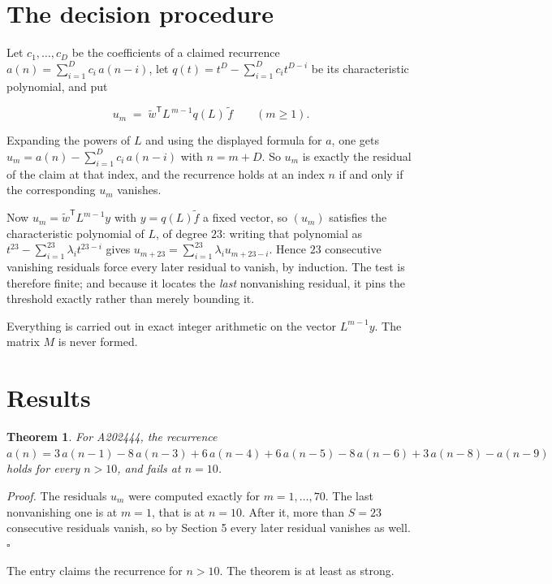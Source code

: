 \documentclass[11pt]{article}
\newtheorem{theorem}{Theorem}
\theoremstyle{definition}
\begin{document}
\section{The decision procedure}

Let $c_1,\dots,c_D$ be the coefficients of a claimed recurrence $a(n) = \sum_{i=1}^{D} c_i\,a(n-i)$, let $q(t) = t^{D} - \sum_{i=1}^{D} c_i t^{D-i}$ be its characteristic polynomial, and put

\[u_m \;=\; \tilde w^{\mathsf T} L^{\,m-1} q(L)\,\tilde f \qquad (m \ge 1).\]

Expanding the powers of $L$ and using the displayed formula for $a$, one gets $u_m = a(n) - \sum_{i=1}^{D} c_i\,a(n-i)$ with $n = m + D$. So $u_m$ is exactly the residual of the claim at that index, and the recurrence holds at an index $n$ if and only if the corresponding $u_m$ vanishes.

Now $u_m = \tilde w^{\mathsf T} L^{m-1} y$ with $y = q(L)\tilde f$ a fixed vector, so $(u_m)$ satisfies the characteristic polynomial of $L$, of degree $23$: writing that polynomial as $t^{23} - \sum_{i=1}^{23} \lambda_i t^{23-i}$ gives $u_{m+23} = \sum_{i=1}^{23} \lambda_i u_{m+23-i}$. Hence $23$ consecutive vanishing residuals force every later residual to vanish, by induction. The test is therefore finite; and because it locates the {\itshape last} nonvanishing residual, it pins the threshold exactly rather than merely bounding it.

Everything is carried out in exact integer arithmetic on the vector $L^{m-1}y$. The matrix $M$ is never formed.

\section{Results}

\begin{theorem} For A202444, the recurrence $a(n) = 3\,a(n-1) - 8\,a(n-3) + 6\,a(n-4) + 6\,a(n-5) - 8\,a(n-6) + 3\,a(n-8) - a(n-9)$ holds for every $n > 10$, and fails at $n = 10$.\end{theorem}

{\itshape Proof.} The residuals $u_m$ were computed exactly for $m = 1,\dots,70$. The last nonvanishing one is at $m = 1$, that is at $n = 10$. After it, more than $S = 23$ consecutive residuals vanish, so by Section 5 every later residual vanishes as well. $\square$

The entry claims the recurrence for $n > 10$. The theorem is at least as strong.
\end{document}
